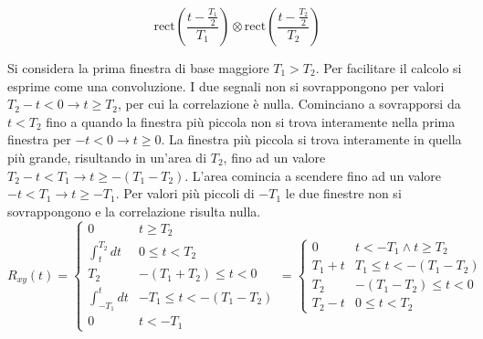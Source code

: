\documentclass{article}
\numberwithin{equation}{subsection}
\begin{document}
\begin{equation*}
    \mbox{rect}\displaystyle\left(\frac{t-\frac{T_1}{2}}{T_1}\right)\otimes\mbox{rect}\left(\frac{t-\frac{T_2}{2}}{T_2}\right)
\end{equation*}

Si considera la prima finestra di base maggiore $T_1>T_2$. Per facilitare il calcolo si esprime come una convoluzione. I due segnali non si sovrappongono per valori 
$T_2-t<0\to t\geq T_2$, per cui la correlazione è nulla. Cominciano a sovrapporsi da $t<T_2$ fino a quando la finestra più piccola non si trova interamente nella prima 
finestra per $-t<0\to t\geq0$. La finestra più piccola si trova interamente in quella più grande, risultando in un'area di $T_2$, fino ad un valore 
$T_2-t<T_1\to t\geq -(T_1-T_2)$. L'area comincia a scendere fino ad un valore $-t<T_1\to t\geq -T_1$. Per valori più piccoli di $-T_1$ le due finestre non si sovrappongono e la 
correlazione risulta nulla.
\begin{equation*}
    R_{xy}(t)=\begin{cases}
        0&t\geq T_2\\
        \displaystyle\int_t^{T_2}dt& 0\leq t<T_2\\
        T_2& -(T_1+T_2)\leq t<0\\
        \displaystyle\int_{-T_1}^tdt& -T_1\leq t<-(T_1-T_2)\\
        0&t<-T_1
    \end{cases}=\begin{cases}
        0& t<-T_1\land t\geq T_2\\
        T_1+t& T_1\leq t<-(T_1-T_2)\\
        T_2& -(T_1-T_2)\leq t<0\\
        T_2-t &  0\leq t<T_2
    \end{cases}
\end{equation*}
\end{document}
